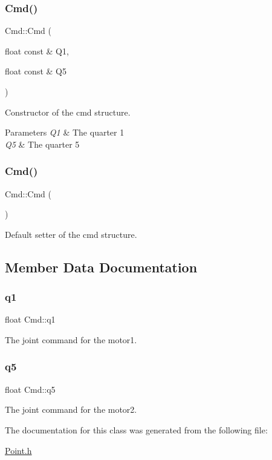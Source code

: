 \subsubsection{\texorpdfstring{Cmd()}{Cmd()}\hspace{0.1cm}{\footnotesize\ttfamily [1/2]}}
{\footnotesize\ttfamily Cmd\+::\+Cmd (\begin{DoxyParamCaption}\item[{float const \&}]{Q1,  }\item[{float const \&}]{Q5 }\end{DoxyParamCaption})\hspace{0.3cm}{\ttfamily [inline]}}



Constructor of the cmd structure. 


\begin{DoxyParams}{Parameters}
{\em Q1} & The quarter 1 \\
\hline
{\em Q5} & The quarter 5 \\
\hline
\end{DoxyParams}
\mbox{\label{struct_cmd_a6fe24cc9190b80a810e30bf8699f7572}} 
\subsubsection{\texorpdfstring{Cmd()}{Cmd()}\hspace{0.1cm}{\footnotesize\ttfamily [2/2]}}
{\footnotesize\ttfamily Cmd\+::\+Cmd (\begin{DoxyParamCaption}{ }\end{DoxyParamCaption})\hspace{0.3cm}{\ttfamily [inline]}}

Default setter of the cmd structure. 

\subsection{Member Data Documentation}
\mbox{\label{struct_cmd_a56fa13e2f2554474e2261a4b2a449945}} 
\subsubsection{\texorpdfstring{q1}{q1}}
{\footnotesize\ttfamily float Cmd\+::q1}

The joint command for the motor1. \mbox{\label{struct_cmd_a8ed212db1c504cfbddc52c52322438db}} 
\subsubsection{\texorpdfstring{q5}{q5}}
{\footnotesize\ttfamily float Cmd\+::q5}

The joint command for the motor2. 

The documentation for this class was generated from the following file\+:\begin{DoxyCompactItemize}
\item 
\mbox{\hyperlink{_point_8h}{Point.\+h}}\end{DoxyCompactItemize}
